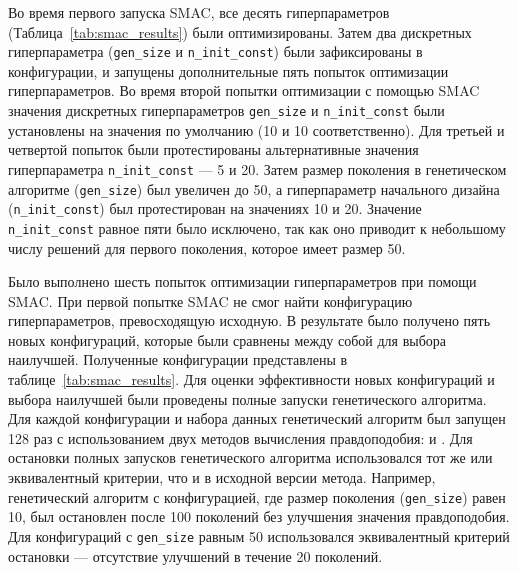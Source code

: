 Во время первого запуска SMAC, все десять гиперпараметров (Таблица~\ref{tab:smac_results}) были оптимизированы. 
Затем два дискретных гиперпараметра (\texttt{gen\_size} и \texttt{n\_init\_const}) были зафиксированы в конфигурации, и запущены дополнительные пять попыток оптимизации гиперпараметров.
Во время второй попытки оптимизации с помощью SMAC значения дискретных гиперпараметров \texttt{gen\_size} и \texttt{n\_init\_const} были установлены на значения по умолчанию (10 и 10 соответственно).
Для третьей и четвертой попыток были протестированы альтернативные значения гиперпараметра \texttt{n\_init\_const} --- 5 и 20.
Затем размер поколения в генетическом алгоритме (\texttt{gen\_size}) был увеличен до 50, а гиперпараметр начального дизайна (\texttt{n\_init\_const}) был протестирован на значениях 10 и 20.
Значение \texttt{n\_init\_const} равное пяти было исключено, так как оно приводит к небольшому числу решений для первого поколения, которое имеет размер 50.

Было выполнено шесть попыток оптимизации гиперпараметров при помощи SMAC.
При первой попытке SMAC не смог найти конфигурацию гиперпараметров, превосходящую исходную.
В результате было получено пять новых конфигураций, которые были сравнены между собой для выбора наилучшей.
Полученные конфигурации представлены в таблице~\ref{tab:smac_results}.
Для оценки эффективности новых конфигураций и выбора наилучшей были проведены полные запуски генетического алгоритма.
Для каждой конфигурации и набора данных генетический алгоритм был запущен 128 раз с использованием двух методов вычисления правдоподобия: \moments и \momi.
Для остановки полных запусков генетического алгоритма использовался тот же или эквивалентный критерии, что и в исходной версии метода.
Например, генетический алгоритм с конфигурацией, где размер поколения (\texttt{gen\_size}) равен 10, был остановлен после 100 поколений без улучшения значения правдоподобия.
Для конфигураций с \texttt{gen\_size} равным 50 использовался эквивалентный критерий остановки --- отсутствие улучшений в течение 20 поколений.

